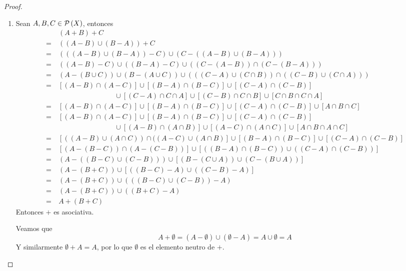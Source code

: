 \documentclass{amsart}
\begin{document}
\begin{proof} \, 
    \begin{enumerate}
        \item Sean $A, B, C \in \mathcal{P}\left(X\right)$, entonces
        \begin{align*}
            &\ (A + B) + C\\ =&\ ((A - B) \cup (B - A)) + C\\
            =&\ (((A - B) \cup (B - A)) - C) \cup (C - ((A - B) \cup (B - A)))\\
            =&\  ((A - B) - C) \cup ((B - A) - C) \cup ((C -(A - B)) \cap (C - (B - A)))\\
            =&\ (A - (B \cup C)) \cup (B - (A \cup C)) \cup (((C - A) \cup (C \cap B)) \cap ((C - B) \cup (C \cap A)))\\
            =&\  [(A - B) \cap (A - C)] \cup [(B - A) \cap (B - C)] \cup [(C - A) \cap (C - B)] \\ 
            &\ \qquad \qquad \qquad \qquad \cup [(C - A) \cap C \cap A] \cup [(C - B) \cap C \cap B] \cup [C \cap B \cap C \cap A]\\
            =&\  [(A - B) \cap (A - C)] \cup [(B - A) \cap (B - C)] \cup [(C - A) \cap (C - B)] \cup [A \cap B \cap C]\\
            =&\  [(A - B) \cap (A - C)] \cup [(B - A) \cap (B - C)] \cup [(C - A) \cap (C - B)] \\ 
            &\ \qquad \qquad \qquad \qquad \cup [(A - B) \cap (A \cap B)] \cup [(A - C) \cap (A \cap C)] \cup [A \cap B \cap A \cap C]\\
            =&\ [((A - B) \cup (A \cap C)) \cap ((A - C) \cup (A \cap B)] \cup [(B - A) \cap (B - C)] \cup [(C - A) \cap (C - B)]\\
            =&\ [(A - (B - C)) \cap (A - (C - B))] \cup [((B - A) \cap (B - C)) \cup ((C - A) \cap (C - B))]\\
            =&\ (A - ((B - C) \cup (C - B))) \cup [(B - (C \cup A)) \cup (C - (B \cup A))]\\
            =&\ (A - (B+C)) \cup [((B - C) - A) \cup ((C - B) - A)]\\
            =&\ (A - (B + C)) \cup (((B - C) \cup (C - B)) - A)\\
            =&\ (A - (B+C)) \cup ((B+C)- A)\\
            =&\  A + (B+C)
        \end{align*}
        Entonces $+$ es asociativa.

        Veamos que
        $$ A + \emptyset = (A - \emptyset) \cup (\emptyset - A) =  A \cup \emptyset = A $$
        Y similarmente $\emptyset + A = A$, por lo que $\emptyset$ es el elemento neutro de $+$.
        

\end{enumerate}
\end{proof}
\end{document}
